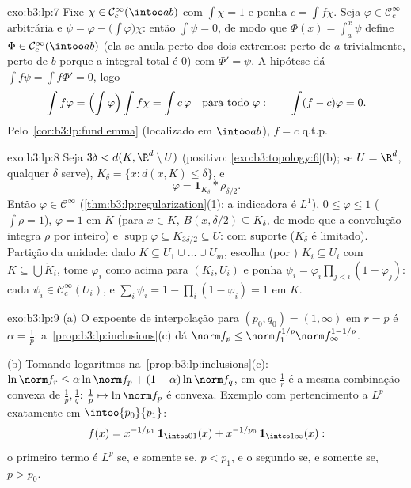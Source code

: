 \begin{solution}{exo:b3:lp:7}
Fixe $\chi \in \mathcal C_c^\infty(\intoo ab)$ com $\int\chi =
1$ e ponha $c = \int f\chi$. Seja $\varphi \in \mathcal
C_c^\infty$ arbitrária e $\psi = \varphi -
\bigl(\int\varphi\bigr)\chi$: então $\int\psi = 0$, de modo que $\Phi(x)
= \int_a^x\psi$ define $\Phi \in \mathcal C_c^\infty(\intoo
ab)$ (ela se anula perto dos dois extremos: perto de $a$ trivialmente, perto de $b$
porque a integral total é $0$) com $\Phi' = \psi$. A
hipótese dá $\int f\psi = \int f\Phi' = 0$, logo
\[
\int f\varphi = \Bigl(\int\varphi\Bigr)\int f\chi = \int
c\,\varphi
\quad\text{para todo } \varphi:
\qquad \int(f - c)\varphi = 0 .
\]
Pelo~\cref{cor:b3:lp:fundlemma} (localizado em $\intoo ab$), $f =
c$ q.t.p.
\end{solution}

\begin{solution}{exo:b3:lp:8}
Seja $3\delta < d(K, \R^d\setminus U)$ (positivo:
\cref{exo:b3:topology:6}(b); se $U = \R^d$, qualquer $\delta$
serve), $K_\delta = \{x : d(x, K) \leq \delta\}$, e
\[
\varphi = \mathbf 1_{K_\delta} * \rho_{\delta/2} .
\]
Então $\varphi \in \mathcal C^\infty$
(\cref{thm:b3:lp:regularization}(1); a indicadora é $L^1$),
$0 \leq \varphi \leq 1$ ($\int\rho = 1$), $\varphi = 1$ em $K$
(para $x \in K$, $\bar B(x, \delta/2) \subseteq K_\delta$, de modo que
a convolução integra $\rho$ por inteiro) e
$\operatorname{supp}\varphi \subseteq K_{3\delta/2} \subseteq
U$: com suporte  ($K_\delta$ é limitado). Partição da
unidade: dado $K \subseteq U_1\cup\dots\cup U_m$, escolha (por
)  $K_i \subseteq U_i$ com $K \subseteq
\bigcup \mathring K_i$, tome $\varphi_i$ como acima para $(K_i,
U_i)$ e ponha $\psi_i = \varphi_i\prod_{j <i}(1 -
\varphi_j)$: cada $\psi_i \in \mathcal C_c^\infty(U_i)$, e
$\sum_i\psi_i = 1 - \prod_i(1 - \varphi_i) = 1$ em $K$.
\end{solution}

\begin{solution}{exo:b3:lp:9}
(a) O expoente de interpolação para $(p_0, q_0) = (1, \infty)$
em $r = p$ é $\alpha = \frac1p$:
a~\cref{prop:b3:lp:inclusions}(c) dá $\norm f_p \leq \norm
f_1^{1/p}\norm f_\infty^{1 - 1/p}$.

(b) Tomando logaritmos na~\cref{prop:b3:lp:inclusions}(c): $\ln\norm f_r \leq
\alpha\ln\norm f_p + (1-\alpha)\ln\norm f_q$, em que $\frac1r$
é a mesma combinação convexa de $\frac1p, \frac1q$: $\frac1p
\mapsto \ln\norm f_p$ é convexa. Exemplo com pertencimento a $L^p$
exatamente em $\intoo{p_0}{p_1}$:
\[
f(x) = x^{-1/p_1}\,\mathbf 1_{\intoo01}(x) +
x^{-1/p_0}\,\mathbf 1_{\intco1\infty}(x):
\]
o primeiro termo é $L^p$ se, e somente se, $p < p_1$, e o segundo se, e somente se, $p >
p_0$.
\end{solution}

